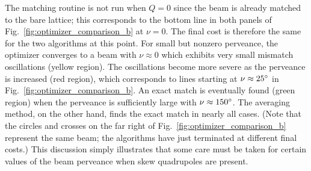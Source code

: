 The matching routine is not run when $Q = 0$ since the beam is already matched to the bare lattice; this corresponds to the bottom line in both panels of Fig.~\ref{fig:optimizer_comparison_b} at $\nu = 0$. The final cost is therefore the same for the two algorithms at this point. For small but nonzero perveance, the optimizer converges to a beam with $\nu \approx 0$ which exhibits very small mismatch oscillations (yellow region). The oscillations become more severe as the perveance is increased (red region), which corresponds to lines starting at $\nu \approx 25\degree$ in Fig.~\ref{fig:optimizer_comparison_b}. An exact match is eventually found (green region) when the perveance is sufficiently large with $\nu \approx 150\degree$. The averaging method, on the other hand, finds the exact match in nearly all cases. (Note that the circles and crosses on the far right of Fig.~\ref{fig:optimizer_comparison_b} represent the same beam; the algorithms have just terminated at different final costs.) This discussion simply illustrates that some care must be taken for certain values of the beam perveance when skew quadrupoles are present.

